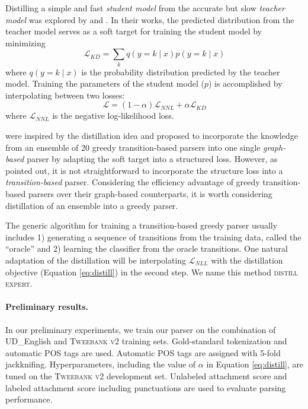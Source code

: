 \documentclass[11pt,a4paper]{article}
\begin{document}
Distilling a simple and fast {\it student model} from the accurate but
slow {\it teacher model} was explored by 
and . In their works, the predicted
distribution from the teacher model serves as a soft target for
training the student model by minimizing
\begin{equation}
\mathcal{L}_{\mathit{KD}} = \sum_k q(y=k\mid x) p(y=k\mid x)
\end{equation} where $q(y=k\mid x)$ is the probability distribution
predicted by the teacher model. Training the parameters of the student model ($p$) is
accomplished by interpolating between two losses:
\begin{equation}\label{eq:distill}
\mathcal{L}=(1-\alpha)\mathcal{L}_{\mathit{NNL}} + \alpha\mathcal{L}_{\mathit{KD}}
\end{equation}
where $\mathcal{L}_{\mathit{NNL}}$ is the negative log-likelihood loss.

 were inspired by the distillation idea and
proposed to incorporate the knowledge from an ensemble of 20 greedy transition-based
parsers into one single \emph{graph-based} parser by adapting the soft
target into a structured loss. However, as 
pointed out, it is not straightforward to incorporate the structure
loss into a \emph{transition-based} parser. Considering the efficiency
advantage of greedy transition-based parsers over their graph-based counterparts,
it is worth considering distillation of an ensemble into a greedy parser.

The generic algorithm for training a transition-based greedy parser
usually includes 1) generating a sequence of transitions from the 
training data, called the ``oracle'' and 2) learning the classifier from
the oracle transitions. One natural adaptation of the distillation will be interpolating
$\mathcal{L}_{\mathit{NLL}}$ with the distillation objective (Equation \ref{eq:distill})
in the second step. We name this method \textsc{distill expert}. 

\paragraph{Preliminary results.}
In our preliminary experiments, we train our parser on the combination of UD\_English
and \textsc{Tweebank v2} training sets. Gold-standard tokenization and automatic POS
tags are used. Automatic POS tags are assigned with 5-fold
jackknifing. Hyperparameters, including the value of $\alpha$ in Equation \ref{eq:distill},
are tuned on the \textsc{Tweebank v2} development set. Unlabeled attachment score and
labeled attachment score including punctuations are used to evaluate parsing performance.
\end{document}
